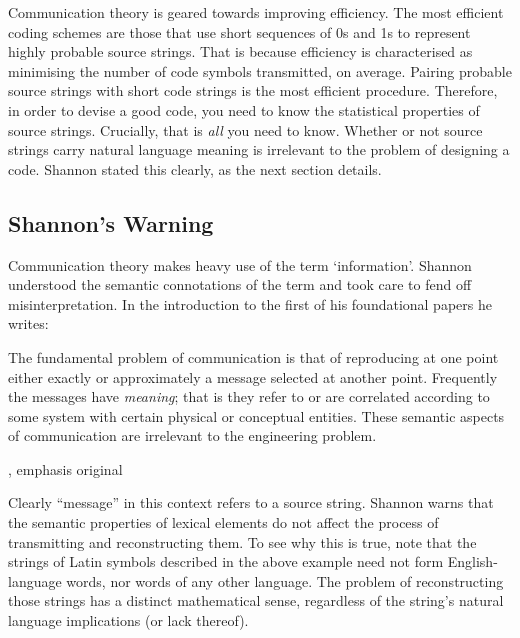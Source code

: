 Communication theory is geared towards improving efficiency.
The most efficient coding schemes are those that use short sequences of 0s and 1s to represent highly probable source strings.
That is because efficiency is characterised as minimising the number of code symbols transmitted, on average.
Pairing probable source strings with short code strings is the most efficient procedure.
Therefore, in order to devise a good code, you need to know the statistical properties of source strings.
Crucially, that is \textit{all} you need to know.
Whether or not source strings carry natural language meaning is irrelevant to the problem of designing a code.
Shannon stated this clearly, as the next section details.

\subsection{Shannon's Warning}\label{subsec:warning}

Communication theory makes heavy use of the term `information'.
Shannon understood the semantic connotations of the term and took care to fend off misinterpretation.
In the introduction to the first of his foundational papers he writes:

\begin{myquote}
The fundamental problem of communication is that of reproducing at one point either exactly or approximately a message selected at another point. Frequently the messages have \emph{meaning}; that is they refer to or are correlated according to some system with certain physical or conceptual entities. These semantic aspects of communication are irrelevant to the engineering problem.
\par\hspace*{\fill}\citet[379]{shannon1948mathematicala}, emphasis original
\end{myquote}

\noindent Clearly ``message'' in this context refers to a source string.
Shannon warns that the semantic properties of lexical elements do not affect the process of transmitting and reconstructing them.
To see why this is true, note that the strings of Latin symbols described in the above example need not form English-language words, nor words of any other language.
The problem of reconstructing those strings has a distinct mathematical sense, regardless of the string's natural language implications (or lack thereof).

